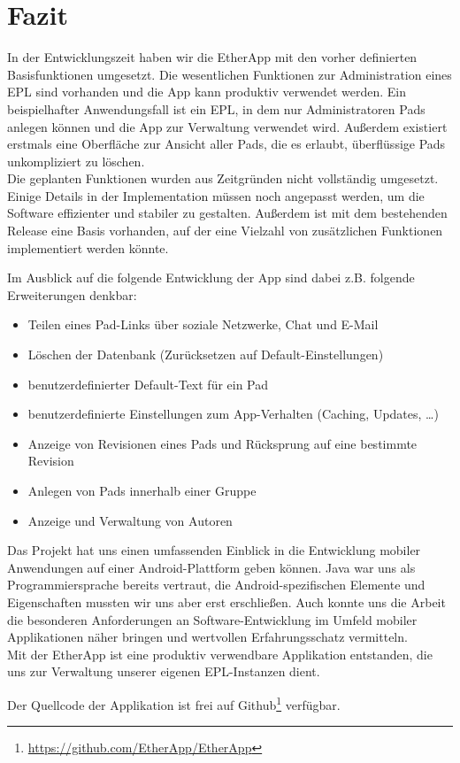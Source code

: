 \section{Fazit}
In der Entwicklungszeit haben wir die EtherApp mit den vorher definierten Basisfunktionen umgesetzt.
Die wesentlichen Funktionen zur Administration eines EPL sind vorhanden und die App kann produktiv verwendet werden.
Ein beispielhafter Anwendungsfall ist ein EPL, in dem nur Administratoren Pads anlegen können und die App zur Verwaltung verwendet wird.
Außerdem existiert erstmals eine Oberfläche zur Ansicht aller Pads, die es erlaubt, überflüssige Pads unkompliziert zu löschen.\\
Die geplanten Funktionen wurden aus Zeitgründen nicht vollständig umgesetzt.
Einige Details in der Implementation müssen noch angepasst werden, um die Software effizienter und stabiler zu gestalten.
Außerdem ist mit dem bestehenden Release eine Basis vorhanden, auf der eine Vielzahl von zusätzlichen Funktionen implementiert werden könnte.

\newpage
Im Ausblick auf die folgende Entwicklung der App sind dabei z.B. folgende Erweiterungen denkbar:

\begin{itemize}
	\item Teilen eines Pad-Links über soziale Netzwerke, Chat und E-Mail
	\item Löschen der Datenbank (Zurücksetzen auf Default-Einstellungen)
	\item benutzerdefinierter Default-Text für ein Pad
	\item benutzerdefinierte Einstellungen zum App-Verhalten (Caching, Updates, …)
	\item Anzeige von Revisionen eines Pads und Rücksprung auf eine bestimmte Revision
	\item Anlegen von Pads innerhalb einer Gruppe
	\item Anzeige und Verwaltung von Autoren
\end{itemize}

Das Projekt hat uns einen umfassenden Einblick in die Entwicklung mobiler Anwendungen auf einer Android-Plattform geben können.
Java war uns als Programmiersprache bereits vertraut, die Android-spezifischen Elemente und Eigenschaften mussten wir uns aber erst erschließen.
Auch konnte uns die Arbeit die besonderen Anforderungen an Software-Entwicklung im Umfeld mobiler Applikationen näher bringen und wertvollen Erfahrungsschatz vermitteln.\\
Mit der EtherApp ist eine produktiv verwendbare Applikation entstanden, die uns zur Verwaltung unserer eigenen EPL-Instanzen dient.

Der Quellcode der Applikation ist frei auf Github\footnote{\url{https://github.com/EtherApp/EtherApp}} verfügbar.
